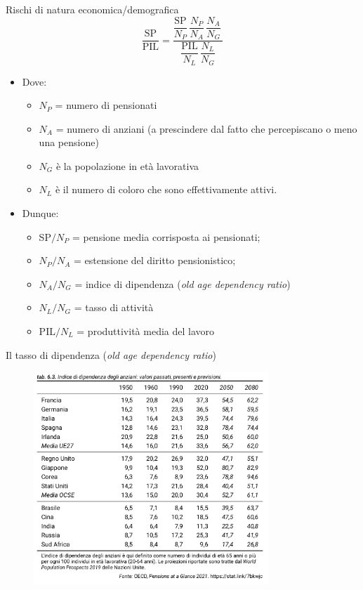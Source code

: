 \documentclass[aspectratio=64,11pt]{beamer}
\begin{document}
\begin{frame}{Rischi di natura economica/demografica}
\begin{equation*}
  \frac{\text{SP}}{\text{PIL}} =\frac{\dfrac{\text{SP}}{N_P}\,\dfrac{N_P}{N_A}\,\dfrac{N_A}{N_G}\,}
  {\dfrac{\text{PIL}}{N_L}\,\dfrac{N_L}{N_G}}
\end{equation*}

\begin{itemize}
\item Dove:
\begin{itemize}
\item $N_P$ = numero di pensionati
\item $N_A$ = numero di anziani (a prescindere dal fatto che percepiscano o meno una pensione)
\item $N_G$ è la popolazione in età lavorativa
\item $N_L$ è il numero di coloro che sono effettivamente attivi.
\end{itemize}
\item Dunque:
\begin{itemize}
\item SP$/N_P$ = pensione media corrisposta ai pensionati;
\item $N_P/N_A$ = estensione del diritto pensionistico;
\item $N_A/N_G$ = indice di dipendenza (\emph{old age dependency ratio})
\item $N_L/N_G$ = tasso di attività
\item $\text{PIL}/N_L$ = produttività media del lavoro
\end{itemize}
\end{itemize}
\end{frame}


\begin{frame}{Il tasso di dipendenza  (\emph{old age dependency ratio})}
\begin{figure}[htbp]
\centering
\includegraphics[height=8cm]{./figure/old-age-dependency-ratio.png}
\end{figure}
\end{frame}
\end{document}

